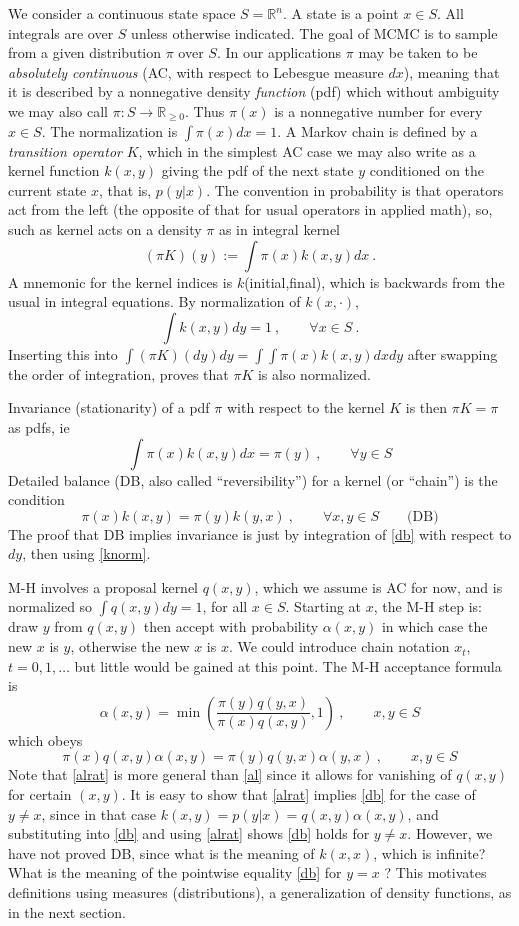 \documentclass[10pt]{article}
\newcommand{\be}{\begin{equation}}
\newcommand{\ee}{\end{equation}}
\newcommand{\R}{\mathbb{R}}
\newcommand{\al}{\alpha}
\begin{document}
We consider a continuous state space $S = \R^n$.
A state is a point $x\in S$.
All integrals are over $S$ unless otherwise indicated.
The goal of MCMC is to sample from a given distribution $\pi$ over $S$.
In our applications $\pi$ may be taken to be
{\em absolutely continuous} (AC, with respect to
Lebesgue measure $dx$), meaning that it is described by a nonnegative
density {\em function} (pdf) which without ambiguity we may also call
$\pi: S \to \R_{\ge 0}$.
Thus $\pi(x)$ is a nonnegative number for every $x\in S$.
The normalization is $\int \pi(x) dx = 1$.
A Markov chain is defined by a {\em transition operator} $K$, which
in the simplest AC case we may also write as a kernel function
$k(x,y)$ giving the pdf
of the next state $y$ conditioned on
the current state $x$, that is, $p(y|x)$.
The convention in probability is that
operators act from the left
(the opposite of that for usual operators in applied math),
so, such as kernel acts on a density $\pi$ as in integral kernel
\be
(\pi K)(y) := \int \pi(x) k(x,y) dx~.
\label{piK}
\ee
A mnemonic for the kernel indices is $k$(initial,final), which is backwards
from the usual in integral equations.
By normalization of $k(x,\cdot)$,
\be
\int k(x,y) dy = 1~, \qquad \forall x\in S~.
\label{knorm}
\ee
Inserting this into
$\int (\pi K)(dy) dy = \int\int \pi(x) k(x,y) dx dy$ after swapping
the order of integration, proves that $\pi K$ is also normalized.

Invariance (stationarity) of a pdf $\pi$ with respect to the kernel $K$
is then $\pi K = \pi$ as pdfs, ie
\be
\int \pi(x) k(x,y) dx = \pi(y)~, \qquad \forall y\in S
\label{inv}
\ee
Detailed balance (DB, also called ``reversibility'') for a kernel
(or ``chain'')
is the condition
\be
\pi(x) k(x,y) = \pi(y) k(y,x)~, \qquad \forall x,y\in S
\qquad \mbox{(DB)}
\label{db}
\ee
The proof that DB implies invariance is just by integration
of \eqref{db} with respect to $dy$, then using \eqref{knorm}.

M-H involves a proposal kernel $q(x,y)$, which we assume is AC for now,
and is normalized so $\int q(x,y) dy = 1$, for all $x\in S$.
Starting at $x$, the M-H step is: draw $y$ from $q(x,y)$ then
accept with probability $\al(x,y)$ in which case the new $x$ is $y$,
otherwise the new $x$ is $x$. We could introduce chain notation
$x_t$, $t=0,1,\dots$ but little would be gained at this point.
The M-H acceptance formula is
\be
\al(x,y) = \min\left(\frac{\pi(y) q(y,x)}{\pi(x) q(x,y)}, 1 \right)
~, \qquad x,y\in S
\label{al}
\ee
which obeys
\be
\pi(x) q(x,y) \al(x,y) = \pi(y) q(y,x) \al(y,x)
~, \qquad x,y\in S
\label{alrat}
\ee
Note that \eqref{alrat} is more general than \eqref{al} since it allows
for vanishing of $q(x,y)$ for certain $(x,y)$.
It is easy to show that \eqref{alrat} implies \eqref{db} for the
case of $y\neq x$, since in that case $k(x,y) = p(y|x) = q(x,y)\al(x,y)$,
and substituting into \eqref{db} and using \eqref{alrat} shows
\eqref{db} holds for $y\neq x$.
However, we have not proved DB, since what is the meaning of $k(x,x)$,
which is infinite?
What is the meaning of the pointwise equality \eqref{db} for $y=x$ ?
This motivates definitions using measures (distributions), a generalization of density functions, as in the next section.
\end{document}
